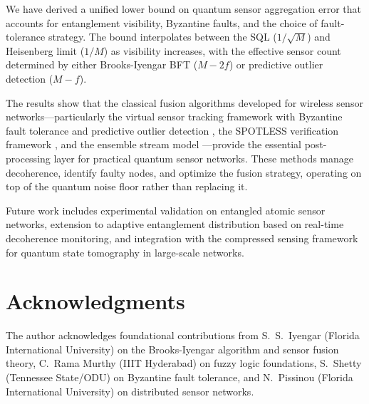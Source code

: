 \documentclass[twocolumn,11pt]{article}
\begin{document}
We have derived a unified lower bound on quantum sensor
aggregation error that accounts for entanglement visibility,
Byzantine faults, and the choice of fault-tolerance strategy.
The bound interpolates between the SQL ($1/\sqrt{M}$) and
Heisenberg limit ($1/M$) as visibility increases, with the
effective sensor count determined by either Brooks-Iyengar
BFT ($M - 2f$) or predictive outlier detection ($M - f$).

The results show that the classical fusion algorithms
developed for wireless sensor networks---particularly the
virtual sensor tracking framework with Byzantine fault
tolerance and predictive outlier detection
\cite{iyer2015virtual}, the SPOTLESS verification framework
\cite{iyer2013spotless}, and the ensemble stream model
\cite{iyer2013dissertation}---provide the essential
post-processing layer for practical quantum sensor networks.
These methods manage decoherence, identify faulty nodes, and
optimize the fusion strategy, operating on top of the quantum
noise floor rather than replacing it.

Future work includes experimental validation on entangled
atomic sensor networks, extension to adaptive entanglement
distribution based on real-time decoherence monitoring, and
integration with the compressed sensing framework
\cite{iyer2010compressed} for quantum state tomography in
large-scale networks.


\section*{Acknowledgments}

The author acknowledges foundational contributions from
S.~S.~Iyengar (Florida International University) on the Brooks-Iyengar algorithm and
sensor fusion theory, C.~Rama Murthy (IIIT Hyderabad) on
fuzzy logic foundations, S.~Shetty (Tennessee State/ODU)
on Byzantine fault tolerance, and N.~Pissinou (Florida International University) on
distributed sensor networks.
\end{document}

